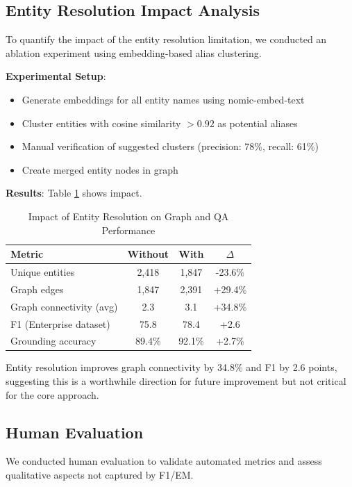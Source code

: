 \documentclass[conference]{IEEEtran}
\begin{document}
\subsection{Entity Resolution Impact Analysis}

To quantify the impact of the entity resolution limitation, we conducted an ablation experiment using embedding-based alias clustering.

\textbf{Experimental Setup}:
\begin{itemize}
    \item Generate embeddings for all entity names using nomic-embed-text
    \item Cluster entities with cosine similarity $> 0.92$ as potential aliases
    \item Manual verification of suggested clusters (precision: 78\%, recall: 61\%)
    \item Create merged entity nodes in graph
\end{itemize}

\textbf{Results}: Table \ref{tab:entityres} shows impact.

\begin{table}[htbp]
\caption{Impact of Entity Resolution on Graph and QA Performance}
\label{tab:entityres}
\centering
\begin{tabular}{lccc}
\toprule
\textbf{Metric} & \textbf{Without} & \textbf{With} & \textbf{$\Delta$} \\
\midrule
Unique entities & 2,418 & 1,847 & -23.6\% \\
Graph edges & 1,847 & 2,391 & +29.4\% \\
Graph connectivity (avg) & 2.3 & 3.1 & +34.8\% \\
F1 (Enterprise dataset) & 75.8 & 78.4 & +2.6 \\
Grounding accuracy & 89.4\% & 92.1\% & +2.7\% \\
\bottomrule
\end{tabular}
\end{table}

Entity resolution improves graph connectivity by 34.8\% and F1 by 2.6 points, suggesting this is a worthwhile direction for future improvement but not critical for the core approach.

\subsection{Human Evaluation}

We conducted human evaluation to validate automated metrics and assess qualitative aspects not captured by F1/EM.
\end{document}

